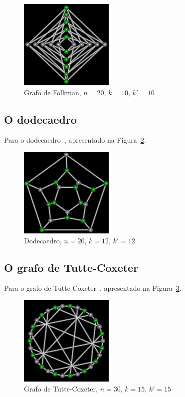 \begin{figure}[htb]
\centering
\includegraphics[width=0.4\textwidth]{img/folkman.png}
\caption{Grafo de Folkman, $n=20$, $k=10$, $k'=10$}
\label{fig:example-folkman}
\end{figure}


\subsection{O dodecaedro}
Para o dodecaedro~\cite{cite:example-plato},
apresentado na Figura~\ref{fig:example-dodecaedro}.

\begin{figure}[htb]
\centering
\includegraphics[width=0.4\textwidth]{img/dodecaedro.png}
\caption{Dodecaedro, $n=20$, $k=12$, $k'=12$}
\label{fig:example-dodecaedro}
\end{figure}

\subsection{O grafo de Tutte-Coxeter}
Para o grafo de Tutte-Coxeter~\cite{cite:example-tutte},
apresentado na Figura~\ref{fig:example-tutte}.

\begin{figure}[htb]
\centering
\includegraphics[width=0.4\textwidth]{img/tutte.png}
\caption{Grafo de Tutte-Coxeter, $n=30$, $k=15$, $k'=15$}
\label{fig:example-tutte}
\end{figure}


